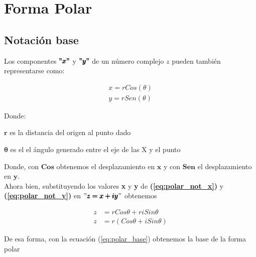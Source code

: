 \section{Forma Polar}

\subsection{Notación base}

Los componentes $\pmb{"x"}$ y $\pmb{"y"}$ de un número complejo $z$ pueden también representarse como:


\begin{align}
    x = rCos(\theta) \label{eq:polar_not_x} \\
    y = rSen(\theta) \label{eq:polar_not_y}
\end{align}

Donde: 

\begin{addmargin}[2em]{2em} %
    $\pmb{r}$ es la distancia del origen al punto dado

    $\pmb{\theta}$ es el el ángulo generado entre el eje de las X y el punto
\end{addmargin}

Donde, con $\pmb{Cos}$ obtenemos el desplazamiento en $\pmb{x}$ y con $\pmb{Sen}$ el desplazamiento en $\pmb{y}$. \\

Ahora bien, substituyendo los valores \textbf{x} y \textbf{y} de \textbf{(\ref{eq:polar_not_x})} y \textbf{(\ref{eq:polar_not_y})} en $"\pmb{z = x + iy}"$ obtenemos

\begin{align}
    z &= rCos\theta + riSin\theta \nonumber\\
    z &= r(Cos\theta + iSin\theta) \label{eq:polar_base}
\end{align}

De esa forma, con la ecuación (\ref{eq:polar_base}) obtenemos la base de la forma polar



